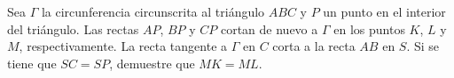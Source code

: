 Sea $\Gamma$ la circunferencia circunscrita al triángulo $ABC$ y $P$ un punto en el interior del triángulo. Las rectas $AP$, $BP$ y $CP$ cortan de nuevo a $\Gamma$ en los puntos $K$, $L$ y $M$, respectivamente. La recta tangente a $\Gamma$ en $C$ corta a la recta $AB$ en $S$. Si se tiene que $SC = SP$, demuestre que $MK = ML$.